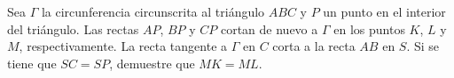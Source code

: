 Sea $\Gamma$ la circunferencia circunscrita al triángulo $ABC$ y $P$ un punto en el interior del triángulo. Las rectas $AP$, $BP$ y $CP$ cortan de nuevo a $\Gamma$ en los puntos $K$, $L$ y $M$, respectivamente. La recta tangente a $\Gamma$ en $C$ corta a la recta $AB$ en $S$. Si se tiene que $SC = SP$, demuestre que $MK = ML$.